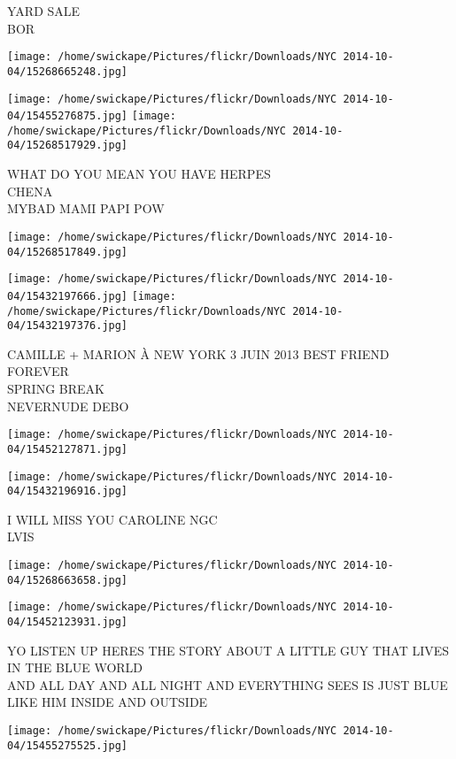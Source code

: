 \documentclass[10pt,letterpaper]{article}
\begin{document}
YARD SALE\\
BOR
\pagebreak

\texttt{[image: /home/swickape/Pictures/flickr/Downloads/NYC 2014-10-04/15268665248.jpg]}

\vspace{0.25in}
\texttt{[image: /home/swickape/Pictures/flickr/Downloads/NYC 2014-10-04/15455276875.jpg]}
\texttt{[image: /home/swickape/Pictures/flickr/Downloads/NYC 2014-10-04/15268517929.jpg]}

WHAT DO YOU MEAN YOU HAVE HERPES\\
CHENA\\
MYBAD MAMI PAPI POW
\pagebreak

\texttt{[image: /home/swickape/Pictures/flickr/Downloads/NYC 2014-10-04/15268517849.jpg]}

\vspace{0.25in}
\texttt{[image: /home/swickape/Pictures/flickr/Downloads/NYC 2014-10-04/15432197666.jpg]}
\texttt{[image: /home/swickape/Pictures/flickr/Downloads/NYC 2014-10-04/15432197376.jpg]}

CAMILLE + MARION À NEW YORK 3 JUIN 2013 BEST FRIEND FOREVER\\
SPRING BREAK\\
NEVERNUDE DEBO
\pagebreak

\texttt{[image: /home/swickape/Pictures/flickr/Downloads/NYC 2014-10-04/15452127871.jpg]}

\vspace{0.25in}
\texttt{[image: /home/swickape/Pictures/flickr/Downloads/NYC 2014-10-04/15432196916.jpg]}

I WILL MISS YOU CAROLINE NGC\\
LVIS
\pagebreak

\texttt{[image: /home/swickape/Pictures/flickr/Downloads/NYC 2014-10-04/15268663658.jpg]}

\vspace{0.25in}
\texttt{[image: /home/swickape/Pictures/flickr/Downloads/NYC 2014-10-04/15452123931.jpg]}

YO LISTEN UP HERES THE STORY ABOUT A LITTLE GUY THAT LIVES IN THE BLUE WORLD\\
AND ALL DAY AND ALL NIGHT AND EVERYTHING SEES IS JUST BLUE LIKE HIM INSIDE AND OUTSIDE
\pagebreak

\texttt{[image: /home/swickape/Pictures/flickr/Downloads/NYC 2014-10-04/15455275525.jpg]}
\end{document}
